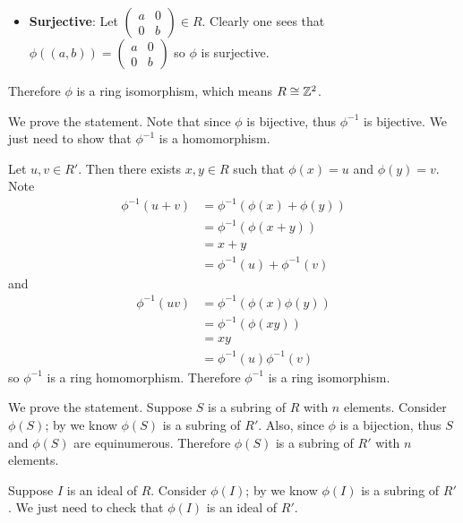 \begin{questions}
\begin{itemize}
        \item \textbf{Surjective}: Let $\begin{pmatrix}a&0\\0&b\end{pmatrix} \in R$. Clearly one sees that $\phi((a, b)) = \begin{pmatrix}a&0\\0&b\end{pmatrix}$ so $\phi$ is surjective.
    \end{itemize}

    Therefore $\phi$ is a ring isomorphism, which means $R \cong \mathbb{Z}^2$.

    \item \begin{partquestions}{\alph*}
        \item We prove the statement. Note that since $\phi$ is bijective, thus $\phi^{-1}$ is bijective. We just need to show that $\phi^{-1}$ is a homomorphism.

        Let $u,v\in R'$. Then there exists $x,y \in R$ such that $\phi(x) = u$ and $\phi(y) = v$. Note
        \begin{align*}
            \phi^{-1}(u + v) &= \phi^{-1}(\phi(x) + \phi(y))\\
            &= \phi^{-1}(\phi(x + y))\\
            &= x + y\\
            &= \phi^{-1}(u) + \phi^{-1}(v)
        \end{align*}
        and
        \begin{align*}
            \phi^{-1}(uv) &= \phi^{-1}(\phi(x)\phi(y))\\
            &= \phi^{-1}(\phi(xy))\\
            &= xy\\
            &= \phi^{-1}(u)\phi^{-1}(v)
        \end{align*}
        so $\phi^{-1}$ is a ring homomorphism. Therefore $\phi^{-1}$ is a ring isomorphism.

        \item We prove the statement. Suppose $S$ is a subring of $R$ with $n$ elements. Consider $\phi(S)$; by  we know $\phi(S)$ is a subring of $R'$. Also, since $\phi$ is a bijection, thus $S$ and $\phi(S)$ are equinumerous. Therefore $\phi(S)$ is a subring of $R'$ with $n$ elements.

        \item Suppose $I$ is an ideal of $R$. Consider $\phi(I)$; by  we know $\phi(I)$ is a subring of $R'$. We just need to check that $\phi(I)$ is an ideal of $R'$.


\end{partquestions}
\end{questions}

